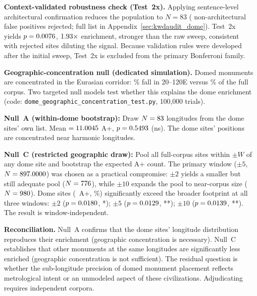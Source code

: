 \documentclass[HARVARD,twocolumn]{USG}
\begin{document}
\textbf{Context-validated robustness check (Test~2x).}
Applying sentence-level architectural confirmation reduces the population
to $N = 83$ (\NcircContextRejected{} non-architectural false positives
rejected; full list in Appendix~\ref{sec:kwdaudit_dome}).
Test~2x yields $p = 0.0076$, $1.93\times$ enrichment, stronger than the
raw sweep, consistent with rejected sites diluting the signal.
Because validation rules were developed after the initial sweep, Test~2x
is excluded from the primary Bonferroni family.

\textbf{Geographic-concentration null (dedicated simulation).}
\label{sec:geo_conc_null}
Domed monuments are concentrated in the Eurasian corridor:
\domeEurasianFraction\% fall in 20\textdegree--120\textdegree{}E
versus \fullCorpusEurasianFraction\% of the full corpus.
Two targeted null models test whether this explains the dome enrichment
(code: \texttt{dome\_geographic\_concentration\_test.py}, 100{,}000 trials).

\textbf{Null~A (within-dome bootstrap):} Draw $N = 83$ longitudes
from the dome sites' own list. Mean $= 11.0045$ A+,
$p = 0.5493$ (ns). The dome sites' positions are concentrated
near harmonic longitudes.

\textbf{Null~C (restricted geographic draw):} Pool all full-corpus sites
within $\pm W$\textdegree{} of any dome site and bootstrap the expected A+
count. The primary window ($\pm 5$\textdegree{}, $N = 897.0000$)
was chosen as a practical compromise: $\pm 2$\textdegree{} yields a smaller
but still adequate pool ($N = 776$), while
$\pm 10$\textdegree{} expands the pool to near-corpus size
($N = 980$). Dome sites (\NcircTierAp~A+, \NcircApRate\%) significantly
exceed the broader footprint at all three windows:
$\pm 2$\textdegree{} ($p = 0.0180$, *);
$\pm 5$\textdegree{} ($p = 0.0129$, **);
$\pm 10$\textdegree{} ($p = 0.0139$, **).
The result is window-independent.

\textbf{Reconciliation.}
Null~A confirms that the dome sites' longitude distribution reproduces their
enrichment (geographic concentration is necessary). Null~C establishes that
other monuments at the same longitudes are significantly less enriched
(geographic concentration is not sufficient). The residual question is whether
the sub-longitude precision of domed monument placement reflects metrological
intent or an unmodeled aspect of these civilizations. Adjudicating requires
independent corpora.
\end{document}
